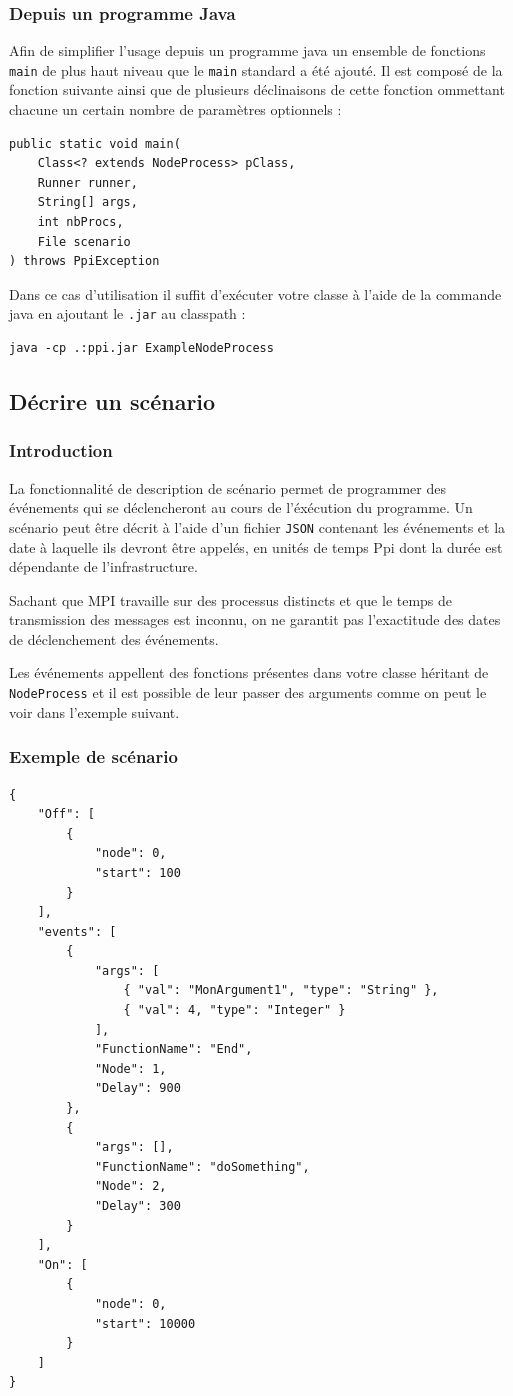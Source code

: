 \documentclass{article}
\begin{document}
		\subsubsection{Depuis un programme Java}
		Afin de simplifier l'usage depuis un programme java un ensemble de fonctions
		\lstinline{main} de plus haut niveau que le \lstinline{main} standard a été ajouté. Il est
		composé de la fonction suivante ainsi que de plusieurs déclinaisons de cette fonction
		ommettant chacune un certain nombre de paramètres optionnels :
		\begin{lstlisting}
public static void main(
	Class<? extends NodeProcess> pClass,
	Runner runner,
	String[] args,
	int nbProcs,
	File scenario
) throws PpiException
		\end{lstlisting}
		Dans ce cas d'utilisation il suffit d'exécuter votre classe à l'aide de la commande java en
		ajoutant le \lstinline{.jar} au classpath :
		\begin{lstlisting}
java -cp .:ppi.jar ExampleNodeProcess
		\end{lstlisting}

		\subsection{Décrire un scénario}
		\subsubsection{Introduction}
		La fonctionnalité de description de scénario permet de programmer des événements qui se
		déclencheront au cours de l'éxécution du programme. Un scénario peut être décrit à l'aide
		d'un fichier \lstinline{JSON} contenant les événements et la date à laquelle ils devront
		être appelés, en unités de temps Ppi dont la durée est dépendante de l'infrastructure.

		Sachant que MPI travaille sur des processus distincts et que le temps de transmission des
		messages est inconnu, on ne garantit pas l'exactitude des dates de déclenchement des
		événements.
		\bigskip

			Les événements appellent des fonctions présentes dans votre classe héritant de
			\lstinline{NodeProcess} et il est possible de leur passer des arguments comme on peut le
			voir dans l'exemple suivant.
			\subsubsection{Exemple de scénario}
			\begin{lstlisting}
{
	"Off": [
		{
			"node": 0,
			"start": 100
		}
	],
	"events": [
		{
			"args": [
				{ "val": "MonArgument1", "type": "String" },
				{ "val": 4, "type": "Integer" }
			],
			"FunctionName": "End",
			"Node": 1,
			"Delay": 900
		},
		{
			"args": [],
			"FunctionName": "doSomething",
			"Node": 2,
			"Delay": 300
		}
	],
	"On": [
		{
			"node": 0,
			"start": 10000
		}
	]
}
			\end{lstlisting}
\end{document}
